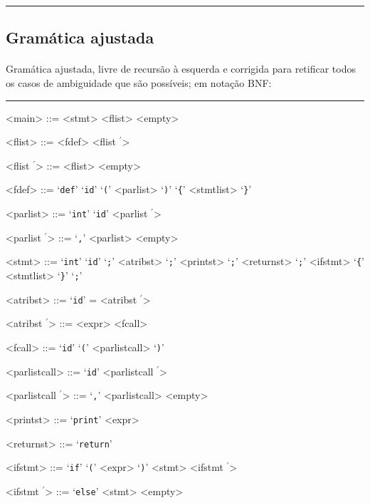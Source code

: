 \documentclass[12pt]{article}
\newcommand{\pprime}{\ensuremath{^{\prime}}}
\begin{document}
\noindent\rule{\textwidth}{0.2pt}

\newpage
\subsection{Gramática ajustada}
\paragraph{}
Gramática ajustada, livre de recursão à esquerda e corrigida para retificar todos os casos de ambiguidade que são 
possíveis; em notação BNF:

\noindent\rule{\textwidth}{0.2pt}

\begin{multicols}{2}
\raggedcolumns
\setlength{\columnseprule}{0.2pt}
\begin{grammar}
<main> ::= <stmt> 
  \alt <flist> 
  \alt <empty>

<flist> ::= <fdef> <flist \pprime>

<flist \pprime> ::= <flist> 
  \alt <empty>

<fdef> ::= ‘\texttt{def}’ ‘\texttt{id}’ ‘\texttt{(}’ <parlist> ‘\texttt{)}’ ‘\texttt{\{}’ <stmtlist> ‘\texttt{\}}’

<parlist> ::= ‘\texttt{int}’ ‘\texttt{id}’ <parlist \pprime>

<parlist \pprime> ::= ‘\texttt{,}’ <parlist> 
  \alt <empty>

<stmt> ::= ‘\texttt{int}’ ‘\texttt{id}’ ‘\texttt{;}’
  \alt <atribst> ‘\texttt{;}’
  \alt <printst> ‘\texttt{;}’
  \alt <returnst> ‘\texttt{;}’
  \alt <ifstmt>
  \alt ‘\texttt{\{}’ <stmtlist> ‘\texttt{\}}’
  \alt ‘\texttt{;}’

<atribst> ::= ‘\texttt{id}’ = <atribst \pprime>

<atribst \pprime> ::= <expr> 
  \alt <fcall>

<fcall> ::= ‘\texttt{id}’ ‘\texttt{(}’ <parlistcall> ‘\texttt{)}’

<parlistcall> ::= ‘\texttt{id}’ <parlistcall \pprime>

<parlistcall \pprime> ::= ‘\texttt{,}’ <parlistcall> 
  \alt <empty>

<printst> ::= ‘\texttt{print}’ <expr>

<returnst> ::= ‘\texttt{return}’

<ifstmt> ::= ‘\texttt{if}’ ‘\texttt{(}’ <expr> ‘\texttt{)}’ <stmt> <ifstmt \pprime>

<ifstmt \pprime> ::= ‘\texttt{else}’ <stmt> 
  \alt <empty>


\end{grammar}
\end{multicols}
\end{document}
